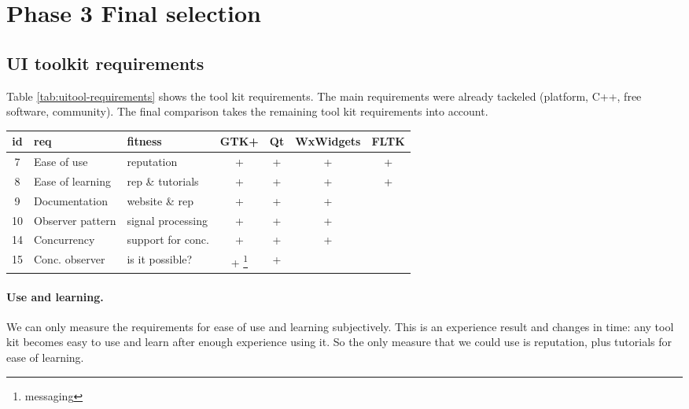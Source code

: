\section{Phase 3 Final selection}

\subsection{UI toolkit requirements} 

Table \ref{tab:uitool-requirements} shows the tool kit requirements. 
The main requirements were already tackeled (platform, C++, free software, community).
The final comparison takes the remaining tool kit requirements into account.

\begin{center}
	\small\sf
	\begin{tabular}{c|p{8em}|p{8em}|cccc|}
		\hline
		{\bf id} & {\bf req}        & {\bf fitness}     & {\bf GTK+} & {\bf Qt} & {\bf WxWidgets} & {\bf FLTK}\\
		\hline
		    7    & Ease of use      & reputation        & +                      & + & + & +\\
		    8    & Ease of learning & rep \& tutorials  & +                      & + & + & +\\
		    9    & Documentation    & website \& rep    & +                      & + & + &  \\
		    10   & Observer pattern & signal processing & +                      & + & + &  \\
		    14   & Concurrency      & support for conc. & +                      & + & + &  \\
		    15   & Conc. observer   & is it possible?   & + \footnote{messaging} & + &   &  \\
	
	\end{tabular}
\end{center}

\paragraph{Use and learning.} We can only measure the requirements for ease of use
and learning subjectively. This is an experience result and changes in time:
any tool kit becomes easy to use and learn after enough experience using it. So the only
measure that we could use is reputation, plus tutorials for ease of learning. 

